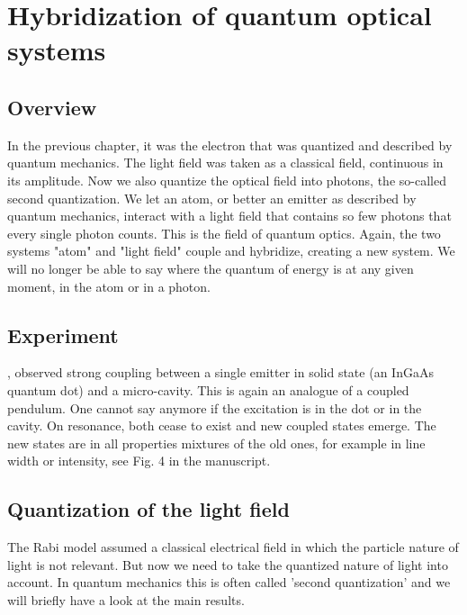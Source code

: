 \renewcommand{\lastmod}{September 13, 2023}
\renewcommand{\chapterauthors}{Markus Lippitz}


\chapter{Hybridization of quantum optical systems}





\section{Overview}

In the previous chapter, it was the electron that was quantized and described by quantum mechanics. The light field was taken as a classical field, continuous in its amplitude. Now we also quantize the optical field into photons, the so-called second quantization. We let an atom, or better an emitter as described by quantum mechanics, interact with a light field that contains so few photons that every single photon counts. This is the field of quantum optics. Again, the two systems "atom" and "light field" couple and hybridize, creating a new system. We will no longer be able to say where the quantum of energy is at any given moment, in the atom or in a photon.



\section{Experiment}

\cite{Reithmaier04}, observed strong coupling between a single emitter in solid state (an InGaAs quantum dot) and a micro-cavity. This is again an analogue of a coupled pendulum. One cannot say anymore if the excitation is in the dot or in the cavity. On resonance, both cease to exist and new coupled states emerge. The new states are in all properties mixtures of the old ones, for example in line width or intensity, see Fig. 4 in the manuscript.

\section{Quantization of the light field}
The Rabi model assumed a classical electrical field in which the particle nature of light is not relevant. But now we need to take the quantized nature of light into account. In quantum mechanics this is often called 'second quantization' and we will briefly have a look at the main results.

